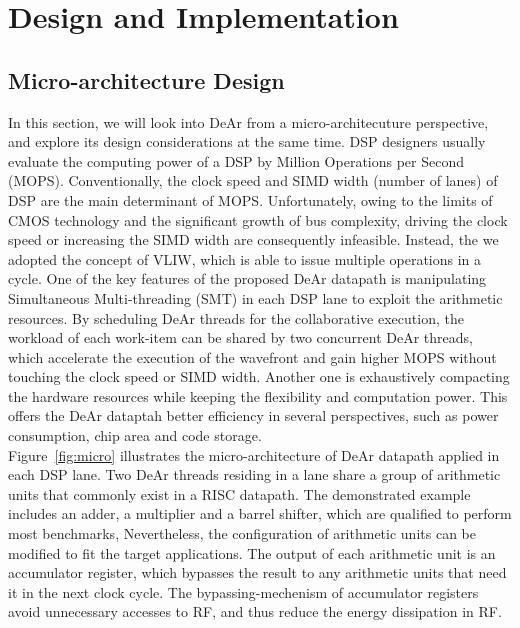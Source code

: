 \chapter{Design and Implementation}
    \section{Micro-architecture Design}
        In this section, we will look into DeAr from a micro-architecuture perspective, and explore its design considerations at the same time.
        DSP designers usually evaluate the computing power of a DSP by Million Operations per Second (MOPS).
        Conventionally, the clock speed and SIMD width (number of lanes) of DSP are the main determinant of MOPS.
        Unfortunately, owing to the limits of CMOS technology and the significant growth of bus complexity, 
        driving the clock speed or increasing the SIMD width are consequently infeasible.
        Instead, the we adopted the concept of VLIW, which is able to issue multiple operations in a cycle.
        One of the key features of the proposed DeAr datapath is manipulating Simultaneous Multi-threading (SMT) in each DSP lane to exploit the arithmetic resources.
        By scheduling DeAr threads for the collaborative execution, the workload of each work-item can be shared by two concurrent DeAr threads, 
        which accelerate the execution of the wavefront and gain higher MOPS without touching the clock speed or SIMD width.
        Another one is exhaustively compacting the hardware resources while keeping the flexibility and computation power.
        This offers the DeAr dataptah better efficiency in several perspectives, such as power consumption, chip area and code storage.
        \\\indent
        Figure~\ref{fig:micro} illustrates the micro-architecture of DeAr datapath applied in each DSP lane.
        Two DeAr threads residing in a lane share a group of arithmetic units that commonly exist in a RISC datapath.
        The demonstrated example includes an adder, a multiplier and a barrel shifter, which are qualified to perform most benchmarks,
        Nevertheless, the configuration of arithmetic units can be modified to fit the target applications.
        The output of each arithmetic unit is an accumulator register, 
        which bypasses the result to any arithmetic units that need it in the next clock cycle.
        The bypassing-mechenism of accumulator registers avoid unnecessary accesses to RF, 
        and thus reduce the energy dissipation in RF.
